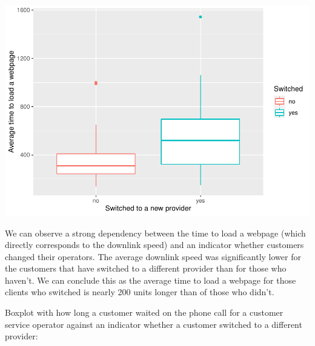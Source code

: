 \documentclass[
]{article}
\newenvironment{Shaded}{\begin{snugshade}}{\end{snugshade}}
\newcommand{\DataTypeTok}[1]{\textcolor[rgb]{0.13,0.29,0.53}{#1}}
\newcommand{\KeywordTok}[1]{\textcolor[rgb]{0.13,0.29,0.53}{\textbf{#1}}}
\newcommand{\NormalTok}[1]{#1}
\newcommand{\OperatorTok}[1]{\textcolor[rgb]{0.81,0.36,0.00}{\textbf{#1}}}
\newcommand{\StringTok}[1]{\textcolor[rgb]{0.31,0.60,0.02}{#1}}
\begin{document}
\begin{Shaded}
\end{Shaded}

\includegraphics{Report_files/figure-latex/unnamed-chunk-3-1.pdf}

We can observe a strong dependency between the time to load a webpage
(which directly corresponds to the downlink speed) and an indicator
whether customers changed their operators. The average downlink speed
was significantly lower for the customers that have switched to a
different provider than for those who haven't. We can conclude this as
the average time to load a webpage for those clients who switched is
nearly 200 units longer than of those who didn't.

Boxplot with how long a customer waited on the phone call for a customer
service operator against an indicator whether a customer switched to a
different provider:
\end{document}
